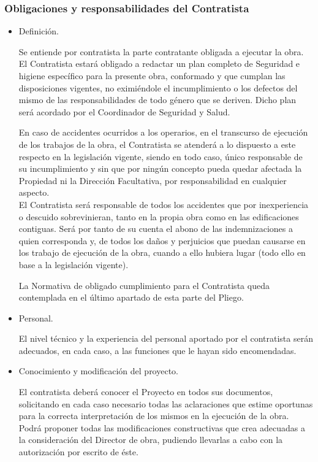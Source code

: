 \documentclass[../main.tex]{subfiles}
\begin{document}
\subsubsection{Obligaciones y responsabilidades del Contratista}
\begin{itemize}
    \item Definición. \par
    \vspace{0.5 cm}
    Se entiende por contratista la parte contratante obligada a ejecutar la obra. El Contratista estará obligado a redactar un plan completo de Seguridad e higiene específico para la presente obra, conformado y que cumplan las disposiciones vigentes, no eximiéndole el incumplimiento o los defectos del mismo de las responsabilidades de todo género que se deriven. Dicho plan será acordado por el Coordinador de Seguridad y Salud. \par
    \vspace{0.5 cm}
    En caso de accidentes ocurridos a los operarios, en el transcurso de ejecución de los trabajos de la obra, el Contratista se atenderá a lo dispuesto a este respecto en la legislación vigente, siendo en todo caso, único responsable de su incumplimiento y sin que por ningún concepto pueda quedar afectada la Propiedad ni la Dirección Facultativa, por responsabilidad en cualquier aspecto. \\
    El Contratista será responsable de todos los accidentes que por inexperiencia o descuido sobrevinieran, tanto en la propia obra como en las edificaciones contiguas. Será por tanto de su cuenta el abono de las indemnizaciones a quien corresponda y, de todos los daños y perjuicios que puedan causarse en los trabajo de ejecución de la obra, cuando a ello hubiera lugar (todo ello en base a la legislación vigente). \par
    \vspace{0.5 cm}
    La Normativa de obligado cumplimiento para el Contratista queda contemplada en el último apartado de esta parte del Pliego.
    \item Personal. \par
    \vspace{0.5 cm}
    El nivel técnico y la experiencia del personal aportado por el contratista serán adecuados, en cada caso, a las funciones que le hayan sido encomendadas.
    \item Conocimiento y modificación del proyecto. \par
    \vspace{0.5 cm}
    El contratista deberá conocer el Proyecto en todos sus documentos, solicitando en cada caso necesario todas las aclaraciones que estime oportunas para la correcta interpretación de los mismos en la ejecución de la obra. Podrá proponer todas las modificaciones constructivas que crea adecuadas a la consideración del Director de obra, pudiendo llevarlas a cabo con la autorización por escrito de éste.

\end{itemize}
\end{document}
